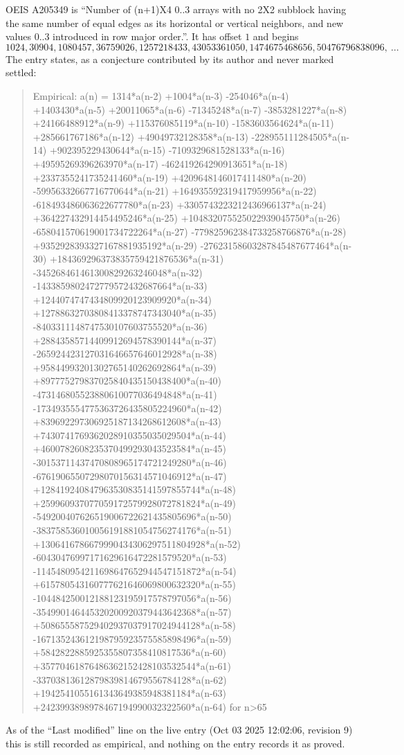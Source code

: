 \documentclass[11pt,a4paper]{article}
\theoremstyle{plain}
\theoremstyle{definition}
\begin{document}
OEIS A205349 is ``Number of (n+1)X4 0..3 arrays with no 2X2 subblock having the same number of equal edges as its horizontal or vertical neighbors, and new values 0..3 introduced in row major order.''. It has offset $1$ and begins
\[
1024, 30904, 1080457, 36759026, 1257218433, 43053361050, 1474675468656, 50476796838096,\ \dots
\]
The entry states, as a conjecture contributed by its author and never marked settled:
\begin{quote}
Empirical: a(n) = 1314*a(n-2) +1004*a(n-3) -254046*a(n-4) +1403430*a(n-5) +20011065*a(n-6) -71345248*a(n-7) -3853281227*a(n-8) +24166488912*a(n-9) +115376085119*a(n-10) -1583603564624*a(n-11) +285661767186*a(n-12) +49049732128358*a(n-13) -228955111284505*a(n-14) +902395229430644*a(n-15) -7109329681528133*a(n-16) +49595269396263970*a(n-17) -462419264290913651*a(n-18) +2337355241735241460*a(n-19) +4209648146017411480*a(n-20) -59956332667716770644*a(n-21) +164935592319417959956*a(n-22) -618493486063622677780*a(n-23) +3305743223212436966137*a(n-24) +364227432914454495246*a(n-25) +104832075525022939045750*a(n-26) -658041570619001734722264*a(n-27) -779825962384733258766876*a(n-28) +9352928393327167881935192*a(n-29) -27623158603287845487677464*a(n-30) +184369296373835759421876536*a(n-31) -345268461461300829263246048*a(n-32) -1433859802472779572432687664*a(n-33) +1244074747434809920123909920*a(n-34) +12788632703808413378747343040*a(n-35) -8403311148747530107603755520*a(n-36) +28843585714409912694578390144*a(n-37) -265924423127031646657646012928*a(n-38) +95844993201302765140262692864*a(n-39) +897775279837025840435150438400*a(n-40) -473146805523880610077036494848*a(n-41) -1734935554775363726435805224960*a(n-42) +839692297306925187134268612608*a(n-43) +7430741769362028910355035029504*a(n-44) +4600782608235370499293043523584*a(n-45) -30153711437470808965174721249280*a(n-46) -67619065507298070156314571046912*a(n-47) +128419240847963530835141597855744*a(n-48) +259960937077059172579928072781824*a(n-49) -549200407626519006722621435805696*a(n-50) -383758536010056191881054756274176*a(n-51) +1306416786679990434306297511804928*a(n-52) -60430476997171629616472281579520*a(n-53) -1145480954211698647652944547151872*a(n-54) +615780543160777621646069800632320*a(n-55) -104484250012188123195917578797056*a(n-56) -354990146445320200920379443642368*a(n-57) +508655587529402937037917024944128*a(n-58) -167135243612198795923575585898496*a(n-59) +5842822885925355807358410817536*a(n-60) +35770461876486362152428103532544*a(n-61) -33703813612879839814679556784128*a(n-62) +1942541055161343649385948381184*a(n-63) +2423993898978467194990032322560*a(n-64) for n>65
\end{quote}
As of the ``Last modified'' line on the live entry (Oct 03 2025 12:02:06, revision 9) this is still
recorded as empirical, and nothing on the entry records it as proved.
\end{document}
